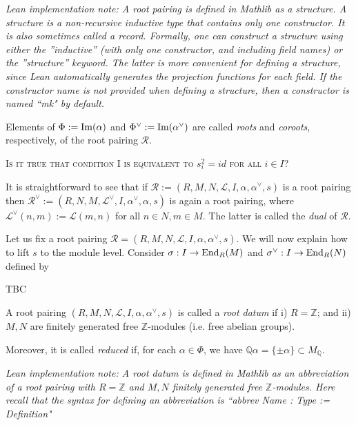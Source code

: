 {\it Lean implementation note: A root pairing is defined in Mathlib as a {\it structure}. A structure is a non-recursive inductive 
type that contains only one constructor. It is also sometimes called a {\it record}. Formally, one can construct a structure using either
the ''inductive'' (with only one constructor, and including field names) or the ''structure'' keyword. The latter is more convenient for defining a structure,
since Lean automatically generates the projection functions for each field. If the constructor name is not provided when defining a structure, then a 
constructor is named ``mk" by default.}

Elements of $\Phi := {\rm Im}(\alpha)$ and $\Phi^\vee := {\rm Im}(\alpha^\vee)$ are called {\it roots} and {\it coroots}, 
respectively, of the root pairing $\mathcal{R}$. 

\textsc{Is it true that condition I is equivalent to $s_i^2 = id$ for all $i \in I$?}

\begin{remark}
    \label{def:dual-root-pairing}
    \leanok
It is straightforward to see that if $\mathcal{R} := (R,M,N,\mathcal{L},I,\alpha, \alpha^\vee,s)$ is 
a root pairing then $\mathcal{R}^\vee := (R,N,M,\mathcal{L}^\vee,I,\alpha^\vee, \alpha,s)$ is again 
a root pairing, where $\mathcal{L}^\vee (n,m) := \mathcal{L}(m,n)$ for all $n \in N,m \in M$. The 
latter is called the {\it dual} of $\mathcal{R}$.
\end{remark}

Let us fix a root pairing $\mathcal{R} = (R,M,N,\mathcal{L},I,\alpha, \alpha^\vee,s)$. We will now 
explain how to lift $s$ to the module level. Consider $\sigma: I \to {\rm End}_R(M)$ and 
$\sigma^\vee : I \to {\rm End}_R(N)$ defined by

TBC

\begin{definition}
    \label{def:root-datum}
    \leanok
     A root pairing $(R,M,N,\mathcal{L},I,\alpha, \alpha^\vee,s)$ is called a {\it root datum} if 
    i) $R = \mathbb{Z}$; and ii) $M,N$ are finitely generated free $\mathbb{Z}$-modules (i.e. free abelian groups).
    
    Moreover, it is called {\it reduced} if, for each $\alpha \in \Phi$, we have 
    $\mathbb{Q}\alpha = \{\pm \alpha\} \subset M_{\mathbb{Q}}$.
\end{definition}

{\it Lean implementation note: A root datum is defined in Mathlib as an abbreviation of 
a root pairing with $R = \mathbb{Z}$ and $M,N$ finitely generated free $\mathbb{Z}$-modules. Here 
recall that the syntax for defining an abbreviation is ``abbrev Name : Type := Definition"}

